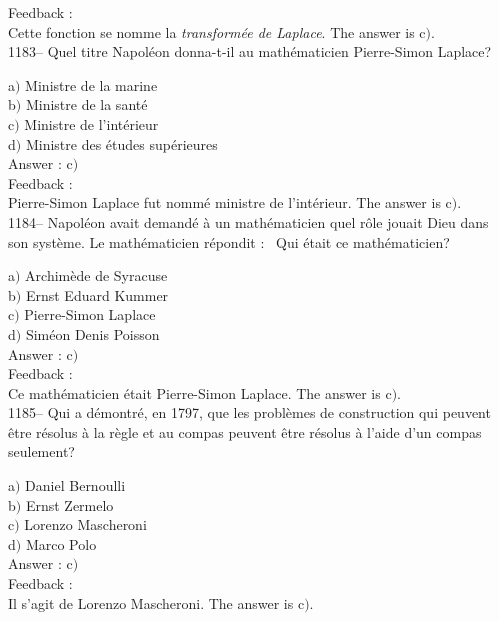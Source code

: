 ﻿\documentclass[letterpaper, 12pt]{article}
\begin{document}
Feedback : \\
Cette fonction se nomme la {\sl transform\'ee de Laplace}.
The answer is c$)$.\\

1183-- Quel titre Napol\'eon  donna-t-il au math\'ematicien
Pierre-Simon Laplace?

a$)$ Ministre de la marine \\
b$)$ Ministre de la sant\'e \\
c$)$ Ministre de l'int\'erieur  \\
d$)$ Ministre des \'etudes sup\'erieures\\

Answer : c$)$\\

Feedback : \\
Pierre-Simon Laplace fut nomm\'e ministre de l'int\'erieur.
The answer is c$)$.\\

1184-- Napol\'eon avait demand\'e \`a un math\'ematicien quel r\^ole
jouait Dieu dans son syst\`eme. Le math\'ematicien r\'epondit :
\fg\ Qui
\'etait ce math\'ematicien?

a$)$ Archim\`ede de Syracuse \\
b$)$ Ernst Eduard Kummer \\
c$)$ Pierre-Simon Laplace \\
d$)$ Sim\'eon Denis Poisson\\

Answer : c$)$\\

Feedback : \\
Ce math\'ematicien \'etait Pierre-Simon Laplace.
The answer is c$)$.\\

1185-- Qui a d\'emontr\'e, en 1797, que les probl\`emes de
construction qui peuvent \^etre r\'esolus \`a la r\`egle et au
compas peuvent \^etre r\'esolus \`a l'aide d'un compas seulement?

a$)$ Daniel Bernoulli \\
b$)$ Ernst Zermelo \\
c$)$ Lorenzo Mascheroni \\
d$)$ Marco Polo\\

Answer : c$)$\\

Feedback : \\
Il s'agit de Lorenzo Mascheroni.
The answer is c$)$.\\
\end{document}
